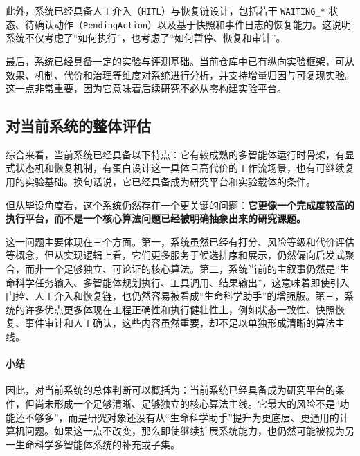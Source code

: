 此外，系统已经具备人工介入（\texttt{HITL}）与恢复链设计，包括若干 \texttt{WAITING\_*} 状态、待确认动作（\texttt{PendingAction}）以及基于快照和事件日志的恢复能力。这说明系统不仅考虑了“如何执行”，也考虑了“如何暂停、恢复和审计”。

最后，系统已经具备一定的实验与评测基础。当前仓库中已有纵向实验框架，可从效果、机制、代价和治理等维度对系统进行分析，并支持增量归因与可复现实验。这一点非常重要，因为它意味着后续研究不必从零构建实验平台。

\subsection{对当前系统的整体评估}

综合来看，当前系统已经具备以下特点：它有较成熟的多智能体运行时骨架，有显式状态机和恢复机制，有蛋白设计这一具体且高代价的工作流场景，也有可继续复用的实验基础。换句话说，它已经具备成为研究平台和实验载体的条件。

但从毕设角度看，这个系统仍然存在一个更关键的问题：\textbf{它更像一个完成度较高的执行平台，而不是一个核心算法问题已经被明确抽象出来的研究课题。}

这一问题主要体现在三个方面。第一，系统虽然已经有打分、风险等级和代价评估等概念，但从实现逻辑上看，它们更多服务于候选排序和展示，仍然偏向启发式聚合，而非一个足够独立、可论证的核心算法。第二，系统当前的主叙事仍然是“生命科学任务输入、多智能体规划执行、工具调用、结果输出”，这意味着即使引入门控、人工介入和恢复链，也仍然容易被看成“生命科学助手”的增强版。第三，系统的许多优点更多体现在工程正确性和执行健壮性上，例如状态一致性、快照恢复、事件审计和人工确认，这些内容虽然重要，却不足以单独形成清晰的算法主线。

\paragraph{小结}
因此，对当前系统的总体判断可以概括为：当前系统已经具备成为研究平台的条件，但尚未形成一个足够清晰、足够独立的核心算法主线。它最大的风险不是“功能还不够多”，而是研究对象还没有从“生命科学助手”提升为更底层、更通用的计算机问题。如果这一点不改变，那么即使继续扩展系统能力，也仍然可能被视为另一生命科学多智能体系统的补充或子集。
